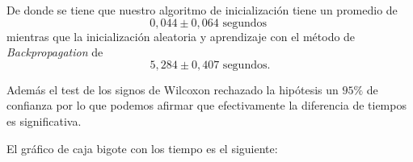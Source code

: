 \begin{table}[H]
    \centering
    \caption{Tiempos en segundos hasta parada empleado por cada algoritmo en las sucesivas iteraciones }
\end{table}



De donde se tiene que nuestro algoritmo de inicialización tiene un promedio de 
\begin{equation}
    0,044 \pm 0,064 \text{ segundos }
\end{equation}
mientras que la inicialización aleatoria y aprendizaje con el método de 
\textit{Backpropagation} de 
\begin{equation}
    5,284 \pm 0,407   \text{ segundos}.
\end{equation}

Además el test de los signos de Wilcoxon rechazado la hipótesis un $95\%$ de confianza
por lo que podemos afirmar que efectivamente la diferencia de tiempos es significativa. 

El gráfico de caja bigote con los tiempo es el siguiente: 

